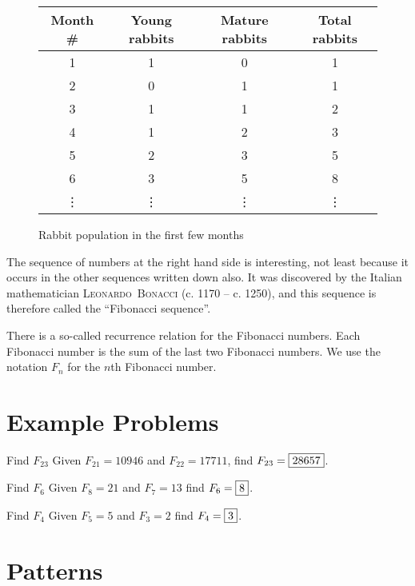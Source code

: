 \documentclass[a4paper,10pt]{report}
\begin{document}
\begin{figure}
 \begin{tabular}{|c|c|c|c|}
  \hline
  Month \# & Young rabbits & Mature rabbits & Total rabbits \\
  \hline
  1 & 1 & 0 & 1 \\
  2 & 0 & 1 & 1 \\
  3 & 1 & 1 & 2 \\
  4 & 1 & 2 & 3 \\
  5 & 2 & 3 & 5 \\
  6 & 3 & 5 & 8 \\
  \vdots & \vdots & \vdots & \vdots \\
  \hline
 \end{tabular}

 \caption{Rabbit population in the first few months}

 \label{fib:rabbit}
\end{figure}

The sequence of numbers at the right hand side is interesting, not least
because it occurs in the other sequences written down also. It was discovered
by the Italian mathematician \textsc{Leonardo~Bonacci} (c. 1170 -- c. 1250),
and this sequence is therefore called the ``Fibonacci sequence''.

There is a so-called recurrence relation for the Fibonacci numbers. Each
Fibonacci number is the sum of the last two Fibonacci numbers. We use the
notation $F_n$ for the $n$th Fibonacci number.

\section{Example Problems}

\begin{problem}{Find $F_{23}$}
 Given $F_{21}=10946$ and $F_{22}=17711$, find $F_{23}=\Ans{28657}$.
\end{problem}

\begin{problem}{Find $F_6$}
 Given $F_8=21$ and $F_7=13$ find $F_6=\Ans{8}$.
\end{problem}

\begin{problem}{Find $F_4$}
 Given $F_5=5$ and $F_3=2$ find $F_4=\Ans{3}$.
\end{problem}

\section{Patterns}
\end{document}
